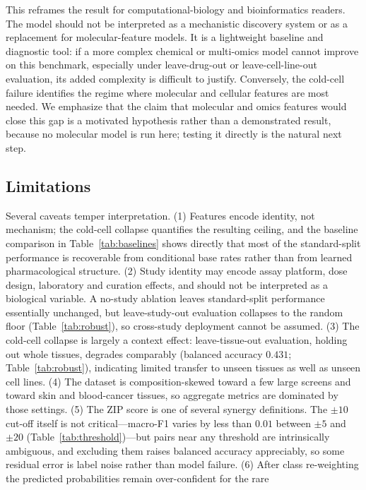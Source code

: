 \documentclass{bmcart}
\begin{document}
This reframes the result for computational-biology and bioinformatics readers. The model should not be
interpreted as a mechanistic discovery system or as a replacement for molecular-feature models. It is
a lightweight baseline and diagnostic tool: if a more complex chemical or multi-omics model cannot
improve on this benchmark, especially under leave-drug-out or leave-cell-line-out evaluation, its added
complexity is difficult to justify. Conversely, the cold-cell failure identifies the regime where
molecular and cellular features are most needed. We emphasize that the claim that molecular and omics
features would close this gap is a motivated hypothesis rather than a demonstrated result, because no
molecular model is run here; testing it directly is the natural next step.

\subsection*{Limitations}
Several caveats temper interpretation. (1) Features encode identity, not mechanism; the cold-cell
collapse quantifies the resulting ceiling, and the baseline comparison in Table~\ref{tab:baselines}
shows directly that most of the standard-split performance is recoverable from conditional base rates
rather than from learned pharmacological structure. (2) Study identity may encode assay platform, dose design,
laboratory and curation effects, and should not be interpreted as a biological variable. A no-study
ablation leaves standard-split performance essentially unchanged, but leave-study-out evaluation
collapses to the random floor (Table~\ref{tab:robust}), so cross-study deployment cannot be assumed.
(3) The cold-cell collapse is largely a context effect: leave-tissue-out evaluation, holding out whole
tissues, degrades comparably (balanced accuracy $0.431$; Table~\ref{tab:robust}), indicating limited
transfer to unseen tissues as well as unseen cell lines. (4) The dataset is composition-skewed
toward a few large screens and toward skin and blood-cancer tissues, so aggregate metrics are dominated
by those settings. (5) The ZIP score is one of several synergy definitions. The $\pm 10$ cut-off itself
is not critical---macro-F1 varies by less than $0.01$ between $\pm 5$ and $\pm 20$
(Table~\ref{tab:threshold})---but pairs near any threshold are intrinsically ambiguous, and excluding
them raises balanced accuracy appreciably, so some residual error is label noise rather than model
failure. (6) After class re-weighting the predicted probabilities remain over-confident for the rare
\end{document}
